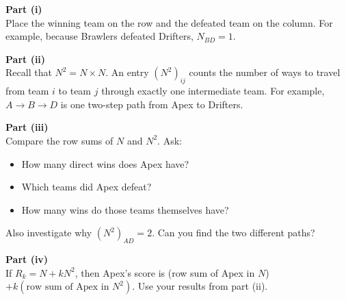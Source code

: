 \begin{hint}
\textbf{Part (i)}\\
Place the winning team on the row and the defeated team on the column. For example, because Brawlers defeated Drifters, $N_{BD}=1$.

\textbf{Part (ii)}\\
Recall that $N^2=N\times N$. An entry $(N^2)_{ij}$ counts the number of ways to travel from team $i$ to team $j$ through exactly one intermediate team. For example, $A\to B\to D$ is one two-step path from Apex to Drifters.

\textbf{Part (iii)}\\
Compare the row sums of $N$ and $N^2$. Ask:
\begin{itemize}
    \item How many direct wins does Apex have?
    \item Which teams did Apex defeat?
    \item How many wins do those teams themselves have?
\end{itemize}
Also investigate why $(N^2)_{AD}=2$. Can you find the two different paths?

\textbf{Part (iv)}\\
If $R_k=N+kN^2$, then Apex's score is (row sum of Apex in $N$) $+ k(\text{row sum of Apex in }N^2)$. Use your results from part (ii).
\end{hint}

